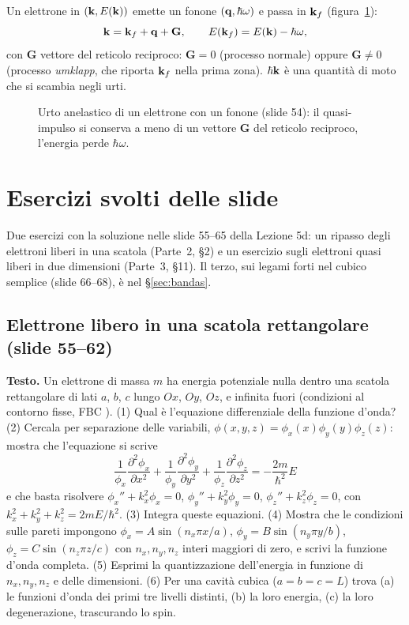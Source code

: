 \documentclass[11pt,a4paper]{article}
\begin{document}
\begin{risultato}
Un elettrone in $(\mathbf k,E(\mathbf k))$ emette un fonone $(\mathbf q,\hbar\omega)$ e passa in $\mathbf k_f$ (figura~\ref{fig:urto}):
\[
\mathbf k=\mathbf k_f+\mathbf q+\mathbf G,\qquad E(\mathbf k_f)=E(\mathbf k)-\hbar\omega ,
\]
con $\mathbf G$ vettore del reticolo reciproco: $\mathbf G=0$ (processo normale) oppure $\mathbf G\ne0$ (processo \emph{umklapp}, che riporta $\mathbf k_f$
nella prima zona). $\hbar\mathbf k$ è una quantità di moto che si scambia negli urti.
\end{risultato}

\begin{figure}[tbp]
\centering
{}
\caption{Urto anelastico di un elettrone con un fonone (slide 54): il quasi-impulso si conserva a meno di un vettore $\mathbf G$ del reticolo reciproco,
l'energia perde $\hbar\omega$.}\label{fig:urto}
\end{figure}

\section{Esercizi svolti delle slide}\label{sec:eserslide}
Due esercizi con la soluzione nelle slide 55--65 della Lezione 5d: un ripasso degli elettroni liberi in una scatola (Parte~2, §2) e un esercizio sugli elettroni quasi
liberi in due dimensioni (Parte~3, §11). Il terzo, sui legami forti nel cubico semplice (slide 66--68), è nel §\ref{sec:bandas}.

\subsection{Elettrone libero in una scatola rettangolare (slide 55--62)}
\textbf{Testo.} Un elettrone di massa $m$ ha energia potenziale nulla dentro una scatola rettangolare di lati $a$, $b$, $c$ lungo $Ox$, $Oy$, $Oz$, e
infinita fuori (condizioni al contorno fisse, FBC ). (1) Qual è l'equazione differenziale della funzione d'onda?
(2) Cercala per separazione delle variabili, $\phi(x,y,z)=\phi_x(x)\phi_y(y)\phi_z(z)$: mostra che l'equazione si scrive
\[
\frac1{\phi_x}\frac{\partial^2\phi_x}{\partial x^2}+\frac1{\phi_y}\frac{\partial^2\phi_y}{\partial y^2}+\frac1{\phi_z}\frac{\partial^2\phi_z}{\partial z^2}
=-\frac{2m}{\hbar^2}E
\]
e che basta risolvere $\phi_x''+k_x^2\phi_x=0$, $\phi_y''+k_y^2\phi_y=0$, $\phi_z''+k_z^2\phi_z=0$, con $k_x^2+k_y^2+k_z^2=2mE/\hbar^2$. (3) Integra
queste equazioni. (4) Mostra che le condizioni sulle pareti impongono $\phi_x=A\sin(n_x\pi x/a)$, $\phi_y=B\sin(n_y\pi y/b)$,
$\phi_z=C\sin(n_z\pi z/c)$ con $n_x,n_y,n_z$ interi maggiori di zero, e scrivi la funzione d'onda completa. (5) Esprimi la quantizzazione
dell'energia in funzione di $n_x,n_y,n_z$ e delle dimensioni. (6) Per una cavità cubica ($a=b=c=L$) trova (a) le funzioni d'onda dei primi tre livelli
distinti, (b) la loro energia, (c) la loro degenerazione, trascurando lo spin.
\end{document}
